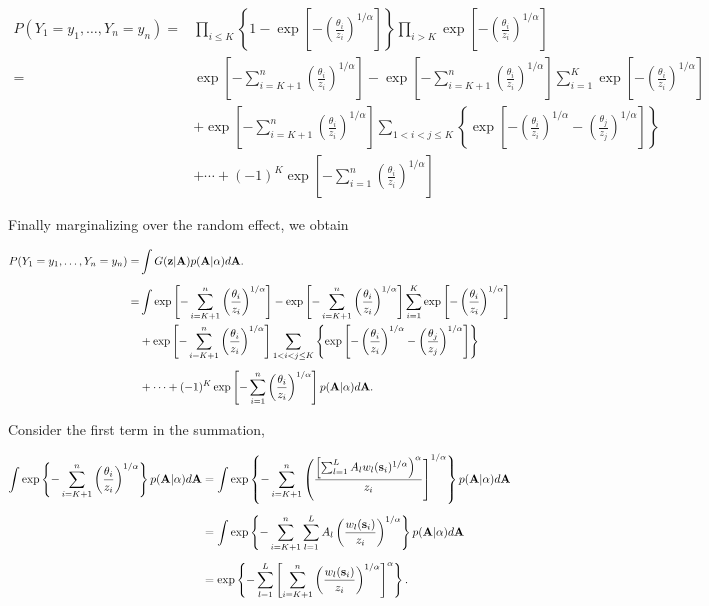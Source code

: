 \documentclass[11pt]{article}
\begin{document}
\begin{align} \label{rbeq:joint_cond}
	P(Y_1=y_1,\ldots,Y_n=y_n) =& \prod_{ i \le K } \left\{ 1 - \exp \left[ - \left( \frac{ \theta_i }{ z_i } \right)^{ 1/\alpha} \right] \right \} \prod_{ i > K } \exp \left[ -\left( \frac{ \theta_i }{ z_i } \right)^{1/\alpha} \right] \nonumber \\[0.5em]
		=& \exp \left[ -\sum_{ i = K+1}^{ n }\left( \frac{ \theta_i }{ z_i } \right)^{1/\alpha} \right] - \exp \left[ -\sum_{ i = K+1}^{ n }\left( \frac{ \theta_i }{ z_i } \right)^{1/\alpha} \right] \sum_{ i = 1}^{K} \exp\left[ -\left( \frac{ \theta_i }{ z_i } \right)^{ 1/\alpha} \right] \nonumber\\
		&  + \exp \left[ -\sum_{ i = K+1}^{ n }\left( \frac{ \theta_i }{ z_i } \right)^{1/\alpha} \right] \sum_{ 1 < i < j \le K } \left\{ \exp \left[ - \left( \frac{ \theta_i }{ z_i } \right)^{ 1/\alpha} - \left( \frac{ \theta_j }{ z_j } \right)^{ 1/\alpha } \right] \right \} \nonumber \\[0.5em]
		& + \cdots + (-1)^K \exp\left[ - \sum_{ i = 1 }^{ n }\left( \frac{ \theta_i }{ z_i } \right)^{ 1/\alpha} \right]
\end{align}

Finally marginalizing over the random effect, we obtain

\begin{align} \label{rbeq:joint}
    P(Y_1=y_1,\ldots,Y_n=y_n) =&\int G(\mbox{\bf z} | \mbox{\bf A}) p( \mbox{\bf A} | \alpha) d\mbox{\bf A}. \nonumber\\[0.5em]
			=& \int \exp \left[ -\sum_{ i = K+1}^{ n }\left( \frac{ \theta_i }{ z_i } \right)^{1/\alpha} \right] - \exp \left[ -\sum_{ i = K+1}^{ n }\left( \frac{ \theta_i }{ z_i } \right)^{1/\alpha} \right] \sum_{ i = 1}^{K} \exp\left[ -\left( \frac{ \theta_i }{ z_i } \right)^{ 1/\alpha} \right] \nonumber\\
		&  + \exp \left[ -\sum_{ i = K+1}^{ n }\left( \frac{ \theta_i }{ z_i } \right)^{1/\alpha} \right] \sum_{ 1 < i < j \le K } \left\{ \exp \left[ - \left( \frac{ \theta_i }{ z_i } \right)^{ 1/\alpha} - \left( \frac{ \theta_j }{ z_j } \right)^{ 1/\alpha } \right] \right \} \nonumber \\[0.5em]
		& + \cdots + (-1)^K \exp\left[ - \sum_{ i = 1 }^{ n }\left( \frac{ \theta_i }{ z_i } \right)^{ 1/\alpha} \right] p( \mbox{\bf A} | \alpha) d\mbox{\bf A}.
\end{align}

Consider the first term in the summation,

\begin{align}
	\int \exp \left\{ -\sum_{ i = K+1}^{ n }\left( \frac{ \theta_i }{ z_i } \right)^{1/\alpha} \right\} p( \mbox{\bf A} | \alpha) d\mbox{\bf A} &= \int \exp \left\{ - \sum_{ i = K + 1 }^n \left( \frac{ \left[ \sum_{ l = 1 }^L  A_l w_{l}(\mbox{\bf s}_i)^{1/\alpha} \right)^\alpha }{ z_i} \right]^{ 1/\alpha } \right \} p( \mbox{\bf A} | \alpha) d\mbox{\bf A} \nonumber \\[0.5em]
	 &= \int \exp \left\{ -\sum_{ i = K + 1}^n \sum_{ l = 1}^L A_l \left( \frac{ w_l (\mbox{\bf s}_i) }{ z_i } \right)^{1/\alpha} \right \} p( \mbox{\bf A} | \alpha) d\mbox{\bf A} \nonumber \\[0.5em]
	 &=\exp\left\{-\sum_{ l = 1}^L \left[ \sum_{ i = K + 1 }^n \left( \frac{ w_l(\mbox{\bf s}_i)}{ z_i} \right)^{1/\alpha} \right]^\alpha \right\}.
\end{align}
\end{document}

